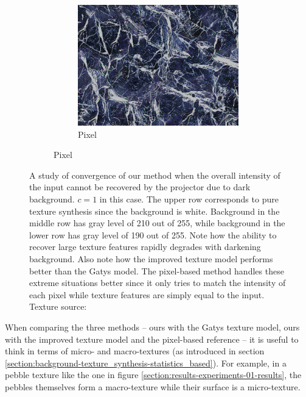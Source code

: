 \begin{figure}[]
\begin{subfigure}{\textwidth}
\begin{subfigure}{0.19\textwidth}
            \includegraphics[width=\textwidth]{images/04-experiment02/isolating_issues/190_pixel.jpg}
            \caption*{Pixel}
        \end{subfigure}
    \end{subfigure}
    \caption{A study of convergence of our method when the overall intensity of the input cannot be recovered by the projector due to dark background. \(c = 1\) in this case. The upper row corresponds to pure texture synthesis since the background is white. Background in the middle row has gray level of 210 out of 255, while background in the lower row has gray level of 190 out of 255. Note how the ability to recover large texture features rapidly degrades with darkening background. Also note how the improved texture model performs better than the Gatys model. The pixel-based method handles these extreme situations better since it only tries to match the intensity of each pixel while texture features are simply equal to the input. Texture source: \citet{Pixar128}}
    \label{fig:ex02-issues}
\end{figure}

When comparing the three methods -- ours with the Gatys texture model, ours with the improved texture model and the pixel-based reference -- it is useful to think in terms of micro- and macro-textures (as introduced in section \ref{section:background-texture_synthesis-statistics_based}). For example, in a pebble texture like the one in figure \ref{section:results-experiments-01-results}, the pebbles themselves form a macro-texture while their surface is a micro-texture. 

